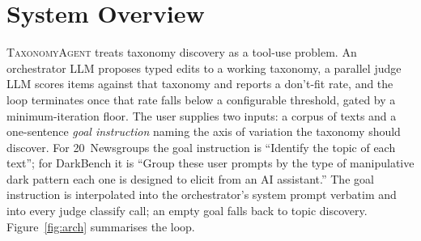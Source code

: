 \section{System Overview}
\label{sec:system}

\textsc{TaxonomyAgent} treats taxonomy discovery as a tool-use
problem. An orchestrator LLM proposes typed edits to a working
taxonomy, a parallel judge LLM scores items against that taxonomy and
reports a don't-fit rate, and the loop terminates once that rate falls
below a configurable threshold, gated by a minimum-iteration floor.
The user supplies two inputs: a corpus of texts and a one-sentence
\emph{goal instruction} naming the axis of variation the taxonomy
should discover. For 20~Newsgroups the goal instruction is
``Identify the topic of each text''; for DarkBench it is ``Group
these user prompts by the type of manipulative dark pattern each one
is designed to elicit from an AI assistant.''
The goal instruction is interpolated into the orchestrator's system
prompt verbatim and into every judge classify call; an empty goal
falls back to topic discovery. Figure~\ref{fig:arch} summarises the loop.

